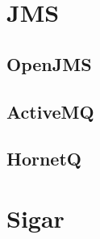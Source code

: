 \appendix
	\hypertarget{hypertarget:appendix}{}

	\chapter{JMS}
		\section{OpenJMS}
		\section{ActiveMQ}
		\section{HornetQ}
		
	\chapter{Sigar}